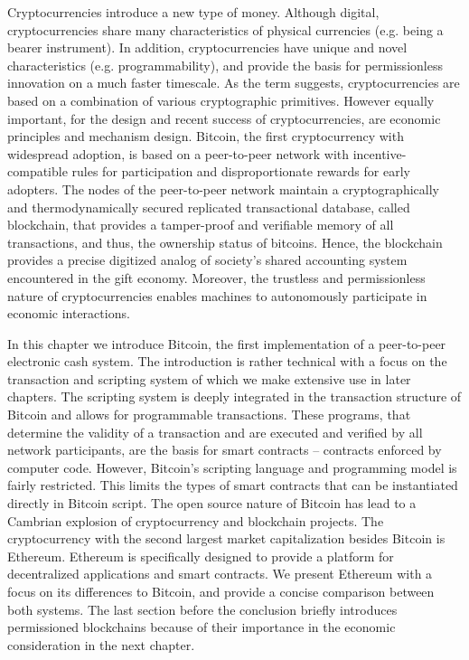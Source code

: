Cryptocurrencies introduce a new type of money. Although digital, cryptocurrencies share many characteristics of physical currencies (e.g. being a bearer instrument). In addition, cryptocurrencies have unique and novel characteristics (e.g. programmability), and provide the basis for permissionless innovation on a much faster timescale. As the term suggests, cryptocurrencies are based on a combination of various cryptographic primitives. However equally important, for the design and recent success of cryptocurrencies, are economic principles and mechanism design. Bitcoin, the first cryptocurrency with widespread adoption, is based on a peer-to-peer network with incentive-compatible rules for participation and disproportionate rewards for early adopters. The nodes of the peer-to-peer network maintain a cryptographically and thermodynamically secured replicated transactional database, called blockchain, that provides a tamper-proof and verifiable memory of all transactions, and thus, the ownership status of bitcoins. Hence, the blockchain provides a precise digitized analog of society's shared accounting system encountered in the gift economy. Moreover, the trustless and permissionless nature of cryptocurrencies enables machines to autonomously participate in economic interactions.

In this chapter we introduce Bitcoin, the first implementation of a peer-to-peer electronic cash system. The introduction is rather technical with a focus on the transaction and scripting system of which we make extensive use in later chapters. The scripting system is deeply integrated in the transaction structure of Bitcoin and allows for programmable transactions. These programs, that determine the validity of a transaction and are executed and verified by all network participants, are the basis for smart contracts -- contracts enforced by computer code. However, Bitcoin's scripting language and programming model is fairly restricted. This limits the types of smart contracts that can be instantiated directly in Bitcoin script. 
The open source nature of Bitcoin has lead to a Cambrian explosion of cryptocurrency and blockchain projects. The cryptocurrency with the second largest market capitalization besides Bitcoin is Ethereum. Ethereum is specifically designed to provide a platform for decentralized applications and smart contracts. We present Ethereum with a focus on its differences to Bitcoin, and provide a concise comparison between both systems. The last section before the conclusion briefly introduces permissioned blockchains because of their importance in the economic consideration in the next chapter.


